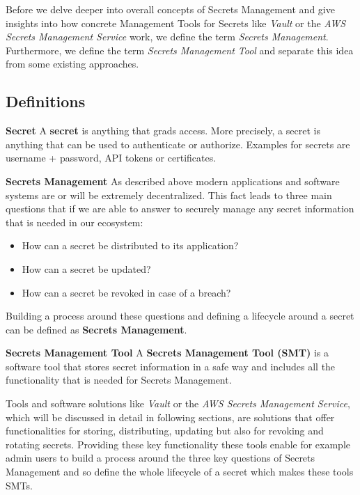 \documentclass[runningheads]{llncs}
\begin{document}
Before we delve deeper into overall concepts of Secrets Management and give insights into how concrete Management Tools for Secrets like \textit{Vault} or the \textit{AWS Secrets Management Service} work, we define the term \textit{Secrets Management}. Furthermore, we define the term \textit{Secrets Management Tool} and separate this idea from some existing approaches.

\subsection{Definitions}

\noindent
\textbf{Secret}\newline
A \textbf{secret} is anything that grads access. More precisely, a secret is anything that can be used to authenticate or authorize. Examples for secrets are username + password, API tokens or certificates.\newline

\noindent
\textbf{Secrets Management}\newline
As described above modern applications and software systems are or will be extremely decentralized. This fact leads to three main questions that if we are able to answer to securely manage any secret information that is needed in our ecosystem: 

\begin{itemize}  
\setlength\itemsep{1mm}
\item How can a secret be distributed to its application?
\item How can a secret be updated?
\item How can a secret be revoked in case of a breach?
\end{itemize}

\noindent
Building a process around these questions and defining a lifecycle around a secret can be defined as \textbf{Secrets Management}.
\newline

\noindent
\textbf{Secrets Management Tool}\newline
A \textbf{Secrets Management Tool (SMT)} is a software tool that stores secret information in a safe way and includes all the functionality that is needed for Secrets Management. 

Tools and software solutions like \textit{Vault} or the \textit{AWS Secrets Management Service}, which will be discussed in detail in following sections, are solutions that offer functionalities for storing, distributing, updating but also for revoking and rotating secrets. Providing these key functionality these tools enable for example admin users to build a process around the three key questions of Secrets Management and so define the whole lifecycle of a secret which makes these tools SMTs.
\end{document}
